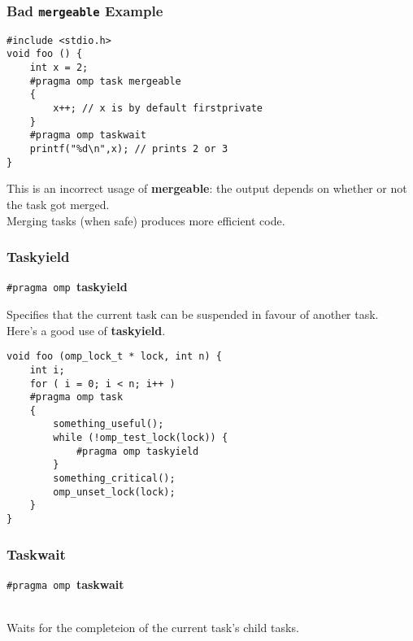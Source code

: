 \begin{frame}[fragile]
  \frametitle{Bad {\tt mergeable} Example}

  
  \begin{lstlisting}
#include <stdio.h>
void foo () {
    int x = 2;
    #pragma omp task mergeable
    {
        x++; // x is by default firstprivate
    }
    #pragma omp taskwait
    printf("%d\n",x); // prints 2 or 3
}
  \end{lstlisting}
  
    This is an incorrect usage of {\bf mergeable}: the output depends
      on whether or not the task got merged.\\[1em]
    Merging tasks (when safe) produces more efficient code.

  
\end{frame}

\begin{frame}[fragile]
  \frametitle{Taskyield}

  
  \begin{center}
    {\tt \#pragma omp }{\bf taskyield}
  \end{center}

    Specifies that the current task can be suspended in favour of another task.\\[1em]

  Here's a good use of {\bf taskyield}.

  \begin{lstlisting}
void foo (omp_lock_t * lock, int n) {
    int i;
    for ( i = 0; i < n; i++ )
    #pragma omp task
    {
        something_useful();
        while (!omp_test_lock(lock)) {
            #pragma omp taskyield
        }
        something_critical();
        omp_unset_lock(lock);
    }
}
  \end{lstlisting}
  
\end{frame}

\begin{frame}[fragile]
  \frametitle{Taskwait}

  

  \begin{center}
    {\tt \#pragma omp }{\bf taskwait}
  \end{center}~\\[1em]

     Waits for the completeion of the current task's child tasks.
  

\end{frame}

